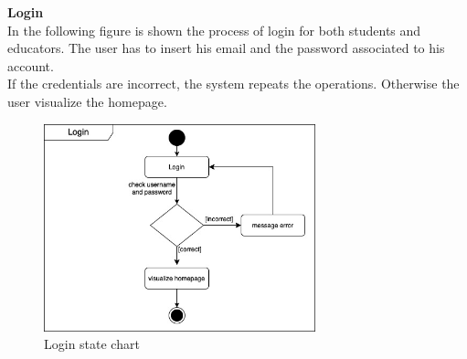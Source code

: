 \textbf{Login}\\
In the following figure is shown the process of login for both students and educators. 
The user has to insert his email and the password associated to his account.
\\If the credentials are incorrect, the system repeats the operations. Otherwise the user visualize the homepage.
\begin{figure} [H]
  \centering
  \includegraphics[width=0.7\textwidth]{images/Login.jpg}
  \caption{Login state chart}
\end{figure} \vspace{1cm}

